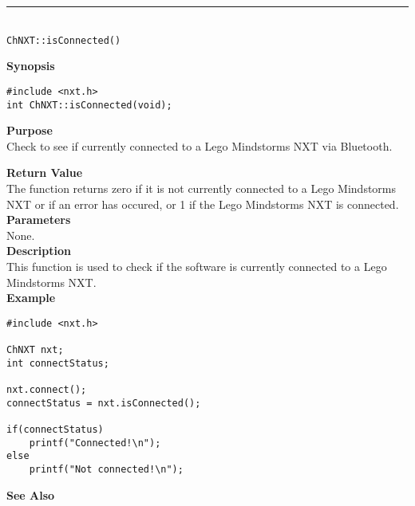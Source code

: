 \noindent
\vspace{5pt}
\rule{4.5in}{0.015in}\\
\noindent
{\LARGE \texttt{ChNXT::isConnected()} }\\


\noindent
{\bf Synopsis}
\vspace{-8pt}
\begin{verbatim}
#include <nxt.h>
int ChNXT::isConnected(void);
\end{verbatim}

\noindent
{\bf Purpose}\\
Check to see if currently connected to a Lego Mindstorms NXT via Bluetooth.

\noindent
{\bf Return Value}\\
The function returns zero if it is not currently connected to a Lego Mindstorms NXT or if an error has occured, or 1 if the Lego Mindstorms NXT is connected.\\

\noindent
{\bf Parameters}\\
None.\\

\noindent
{\bf Description}\\
This function is used to check if the software is currently connected to a Lego Mindstorms NXT.\\

\noindent
{\bf Example}
\begin{verbatim}
#include <nxt.h>

ChNXT nxt;
int connectStatus;

nxt.connect();
connectStatus = nxt.isConnected();

if(connectStatus)
    printf("Connected!\n");
else
    printf("Not connected!\n");
\end{verbatim}

\noindent
{\bf See Also}\\
